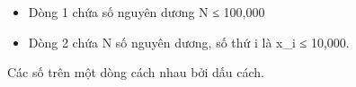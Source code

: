 \begin{itemize}
	\item Dòng 1 chứa số nguyên dương N ≤ 100,000
	\item Dòng 2 chứa N số nguyên dương, số thứ i là x\_i ≤ 10,000.
\end{itemize}

Các số trên một dòng cách nhau bởi dấu cách.

\